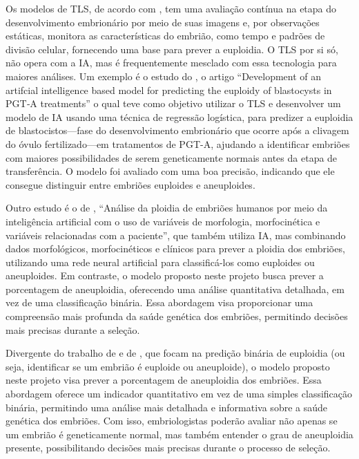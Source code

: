 Os modelos de TLS, de acordo com , tem uma avaliação contínua na etapa do desenvolvimento embrionário por meio de suas imagens e, por observações estáticas, monitora as características do embrião, como tempo e padrões de divisão celular, fornecendo uma base para prever a euploidia. O TLS por si só, não opera com a IA, mas é frequentemente mesclado com essa tecnologia para maiores análises. Um exemplo é o estudo do , o artigo “Development of an artifcial intelligence based model for predicting the euploidy of blastocysts in PGT‐A treatments” o qual teve como objetivo utilizar o TLS e desenvolver um modelo de IA usando uma técnica de regressão logística, para predizer a euploidia de blastocistos—fase do desenvolvimento embrionário que ocorre após a clivagem do óvulo fertilizado—em tratamentos de PGT-A, ajudando a identificar embriões com maiores possibilidades de serem geneticamente normais antes da etapa de transferência. O modelo foi avaliado com uma boa precisão, indicando que ele consegue distinguir entre embriões euploides e aneuploides.

Outro estudo é o de , “Análise da ploidia de embriões humanos por meio da inteligência artificial com o uso de variáveis de morfologia, morfocinética e variáveis relacionadas com a paciente”, que também utiliza IA, mas combinando dados morfológicos, morfocinéticos e clínicos para prever a ploidia dos embriões, utilizando uma rede neural artificial para classificá-los como euploides ou aneuploides. Em contraste, o modelo proposto neste projeto busca prever a porcentagem de aneuploidia, oferecendo uma análise quantitativa detalhada, em vez de uma classificação binária. Essa abordagem visa proporcionar uma compreensão mais profunda da saúde genética dos embriões, permitindo decisões mais precisas durante a seleção. 

Divergente do trabalho de  e de , que focam na predição binária de euploidia (ou seja, identificar se um embrião é euploide ou aneuploide), o modelo proposto neste projeto visa prever a porcentagem de aneuploidia dos embriões. Essa abordagem oferece um indicador quantitativo em vez de uma simples classificação binária, permitindo uma análise mais detalhada e informativa sobre a saúde genética dos embriões. Com isso, embriologistas poderão avaliar não apenas se um embrião é geneticamente normal, mas também entender o grau de aneuploidia presente, possibilitando decisões mais precisas durante o processo de seleção.


